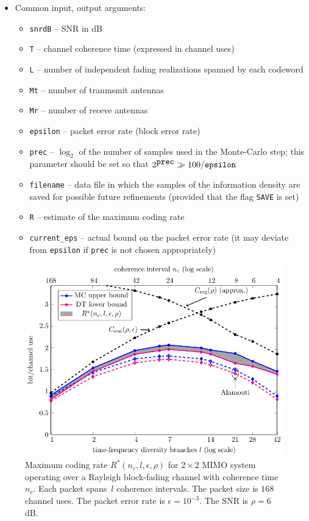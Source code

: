 \documentclass[a4paper,11p]{memoir}
\begin{document}
\begin{itemize}
  
  \item Common input, output arguments: 
  \begin{itemize}
    \item \verb|snrdB| -- SNR in dB
    \item \verb|T| -- channel coherence time (expressed in channel uses)
    \item \verb|L| -- number of independent fading realizations spanned by each codeword
    \item \verb|Mt| -- number of tranmsmit antennas
    \item \verb|Mr| -- number of receve antennas
    \item \verb|epsilon| -- packet error rate (block error rate)
    \item \verb|prec| -- $\log_2$ of the number of samples used in the Monte-Carlo step; this parameter should be set so that $2^{\verb|prec|} \gg 100 / \verb|epsilon|$
    \item \verb|filename| -- data file in which the samples of the information density are saved for possible future refinements (provided that the flag \verb|SAVE| is set)
    \item \verb|R| -- estimate of the maximum coding rate
    \item \verb|current_eps| -- actual bound on the packet error rate (it may  deviate from \verb|epsilon| if \verb|prec| is not chosen appropriately)
  \end{itemize}
  
\end{itemize}

   \begin{figure}[t]
    \centering
      \includegraphics[width=.9\textwidth]{./plots/snr6eps03M2}
    \caption{Maximum coding rate $R^\ast(n_c,l,\epsilon,\rho)$ for $2\times 2$ MIMO system operating over a Rayleigh block-fading channel with coherence time $n_c$.
    Each packet spans~$l$ coherence intervals. The packet size is $168$ channel uses. The packet error rate is $\epsilon=10^{-3}$.
    The SNR is $\rho=6$ dB.}
    \label{fig:snr6eps03M2}
  \end{figure}
  
\end{document}
